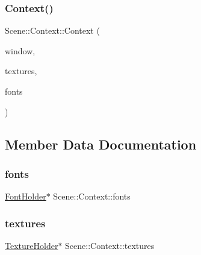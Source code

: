 \subsubsection{\texorpdfstring{Context()}{Context()}}
{\footnotesize\ttfamily Scene\+::\+Context\+::\+Context (\begin{DoxyParamCaption}\item[{sf\+::\+Render\+Window \&}]{window,  }\item[{\hyperlink{_resource_identifiers_8h_a96220f9135333a0209f9367a28b7da13}{Texture\+Holder} \&}]{textures,  }\item[{\hyperlink{_resource_identifiers_8h_ac2733d29d4a4d26a739742097fc51ede}{Font\+Holder} \&}]{fonts }\end{DoxyParamCaption})}



\subsection{Member Data Documentation}
\hypertarget{struct_scene_1_1_context_ae8a09bf6b99a1081940f2f2d73db0272}{}\label{struct_scene_1_1_context_ae8a09bf6b99a1081940f2f2d73db0272} 
\subsubsection{\texorpdfstring{fonts}{fonts}}
{\footnotesize\ttfamily \hyperlink{_resource_identifiers_8h_ac2733d29d4a4d26a739742097fc51ede}{Font\+Holder}$\ast$ Scene\+::\+Context\+::fonts}

\hypertarget{struct_scene_1_1_context_a6ec97ee92bfa4d09abc6edc9508d0050}{}\label{struct_scene_1_1_context_a6ec97ee92bfa4d09abc6edc9508d0050} 
\subsubsection{\texorpdfstring{textures}{textures}}
{\footnotesize\ttfamily \hyperlink{_resource_identifiers_8h_a96220f9135333a0209f9367a28b7da13}{Texture\+Holder}$\ast$ Scene\+::\+Context\+::textures}

\hypertarget{struct_scene_1_1_context_a4ea0d87e64ed3888a01bfb67e7ac1b84}{}\label{struct_scene_1_1_context_a4ea0d87e64ed3888a01bfb67e7ac1b84} 
